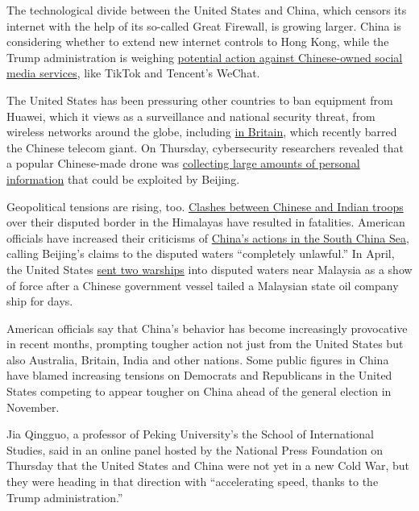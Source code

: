 The technological divide between the United States and China, which
censors its internet with the help of its so-called Great Firewall, is
growing larger. China is considering whether to extend new internet
controls to Hong Kong, while the Trump administration is weighing
\href{https://www.nytimes.com/2020/07/15/technology/tiktok-washington-lobbyist.html}{potential
action against Chinese-owned social media services}, like TikTok and
Tencent's WeChat.

The United States has been pressuring other countries to ban equipment
from Huawei, which it views as a surveillance and national security
threat, from wireless networks around the globe, including
\href{https://www.nytimes.com/2020/07/14/business/huawei-uk-5g.html}{in
Britain}, which recently barred the Chinese telecom giant. On Thursday,
cybersecurity researchers revealed that a popular Chinese-made drone was
\href{https://www.nytimes.com/2020/07/23/us/politics/dji-drones-security-vulnerability.html}{collecting
large amounts of personal information} that could be exploited by
Beijing.

Geopolitical tensions are rising, too.
\href{https://www.nytimes.com/interactive/2020/07/18/world/asia/china-india-border-conflict.html}{Clashes
between Chinese and Indian troops} over their disputed border in the
Himalayas have resulted in fatalities. American officials have increased
their criticisms of
\href{https://www.nytimes.com/2020/07/13/world/asia/south-china-sea-pompeo.html}{China's
actions in the South China Sea}, calling Beijing's claims to the
disputed waters ``completely unlawful.'' In April, the United States
\href{https://www.nytimes.com/2020/04/21/world/asia/coronavirus-south-china-sea-warships.html}{sent
two warships} into disputed waters near Malaysia as a show of force
after a Chinese government vessel tailed a Malaysian state oil company
ship for days.

American officials say that China's behavior has become increasingly
provocative in recent months, prompting tougher action not just from the
United States but also Australia, Britain, India and other nations. Some
public figures in China have blamed increasing tensions on Democrats and
Republicans in the United States competing to appear tougher on China
ahead of the general election in November.

Jia Qingguo, a professor of Peking University's the School of
International Studies, said in an online panel hosted by the National
Press Foundation on Thursday that the United States and China were not
yet in a new Cold War, but they were heading in that direction with
``accelerating speed, thanks to the Trump administration.''

